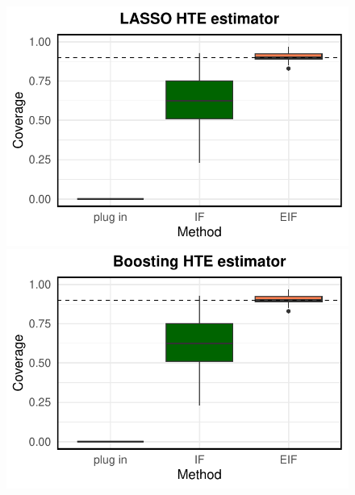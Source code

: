 \documentclass[twoside]{article}
\newcommand{\1}{{\mathbbm{1}}}
\begin{document}
\begin{figure}[ht]
        \centering
        \begin{minipage}{0.15\textwidth}
                \centering
                \includegraphics[clip, trim = 0cm 0cm 0cm 0cm, width = \textwidth]{plot/simulation_true_coverage_LASSO.pdf}
        \end{minipage}
        \begin{minipage}{0.15\textwidth}
                \centering
                \includegraphics[clip, trim = 0cm 0cm 0cm 0cm, width = \textwidth]{plot/simulation_true_coverage_Boosting.pdf}
        \end{minipage}
        \begin{minipage}{0.15\textwidth}
                \centering

\end{minipage}
\end{figure}
\end{document}
